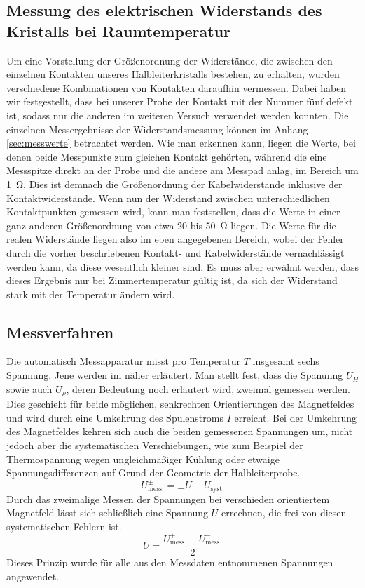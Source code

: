 \subsection{Messung des elektrischen Widerstands des Kristalls bei
Raumtemperatur}
Um eine Vorstellung der Größenordnung der Widerstände, die zwischen den
einzelnen Kontakten unseres Halbleiterkristalls bestehen, zu erhalten, wurden
verschiedene Kombinationen von Kontakten daraufhin vermessen. Dabei haben wir
festgestellt, dass bei unserer Probe der Kontakt mit der Nummer fünf defekt
ist, sodass nur die anderen im weiteren Versuch verwendet werden konnten. Die
einzelnen Messergebnisse der Widerstandsmessung können im Anhang
\ref{sec:messwerte} betrachtet werden. Wie man erkennen kann, liegen die
Werte, bei denen beide Messpunkte zum gleichen Kontakt gehörten, während die
eine Messspitze direkt an der Probe und die andere am Messpad anlag, im Bereich
um \SI{1}{\ohm}. Dies ist demnach die Größenordnung der Kabelwiderstände
inklusive der Kontaktwiderstände. Wenn nun der Widerstand zwischen
unterschiedlichen Kontaktpunkten gemessen wird, kann man feststellen, dass die 
Werte in einer ganz anderen Größenordnung von etwa 20 bis \SI{50}{\ohm} liegen.
Die Werte für die realen Widerstände liegen also im eben angegebenen Bereich,
wobei der Fehler durch die vorher beschriebenen Kontakt- und Kabelwiderstände
vernachlässigt werden kann, da diese wesentlich kleiner sind. Es muss aber
erwähnt werden, dass dieses Ergebnis nur bei Zimmertemperatur gültig ist, da
sich der Widerstand stark mit der Temperatur ändern wird.

\subsection{Messverfahren}

Die automatisch Messapparatur misst pro Temperatur $T$ insgesamt sechs Spannung.
Jene werden im \cite{script} näher erläutert. Man stellt fest, dass die
Spanunng $U_H$ sowie auch $U_ρ$, deren Bedeutung noch erläutert wird, zweimal
gemessen werden. Dies geschieht für beide möglichen, senkrechten Orientierungen
des Magnetfeldes und wird durch eine Umkehrung des Spulenstroms $I$ erreicht.
Bei der Umkehrung des Magnetfeldes kehren sich auch die beiden gemessenen Spannungen
um, nicht jedoch aber die systematischen Verschiebungen, wie zum Beispiel der
Thermospannung wegen ungleichmäßiger Kühlung oder etwaige Spannungsdifferenzen
auf Grund der Geometrie der Halbleiterprobe.
\begin{equation}
 U_{\mbox{mess.}}^± = ± U + U_{\mbox{syst.}}
\end{equation}
Durch das zweimalige Messen der Spannungen bei verschieden orientiertem Magnetfeld lässt sich schließlich eine Spannung
$U$ errechnen, die frei von diesen systematischen Fehlern ist.
\begin{equation}
 U = \frac{U_{\mbox{mess.}}^+ - U_{\mbox{mess.}}^-}{2}
\end{equation}
Dieses Prinzip wurde für alle aus den Messdaten entnommenen Spannungen angewendet.



